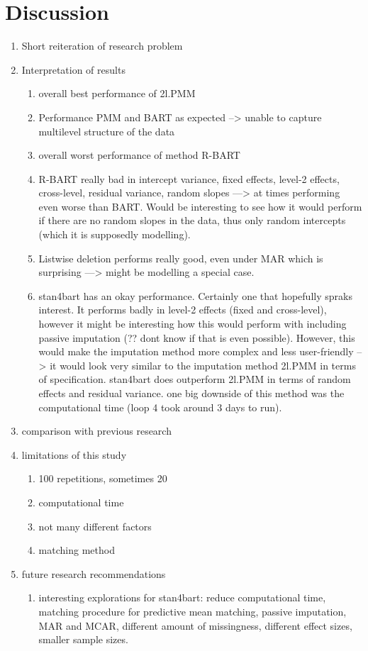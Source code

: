 \documentclass[10pt, a4paper, titlepage]{article}
\begin{document}
\section{Discussion}
\begin{enumerate}
    \item Short reiteration of research problem
    \item Interpretation of results
    \begin{enumerate}
        \item overall best performance of 2l.PMM 
        \item Performance PMM and BART as expected --> unable to capture multilevel structure of the data 
        \item overall worst performance of method R-BART
        \item R-BART really bad in intercept variance, fixed effects, level-2 effects, cross-level, residual variance, random slopes ---> at times performing even worse than BART. Would be interesting to see how it would perform if there are no random slopes in the data, thus only random intercepts (which it is supposedly modelling). 
        \item Listwise deletion performs really good, even under MAR which is surprising ---> might be modelling a special case. 
        \item stan4bart has an okay performance. Certainly one that hopefully spraks interest. It performs badly in level-2 effects (fixed and cross-level), however it might be interesting how this would perform with including passive imputation (?? dont know if that is even possible). However, this would make the imputation method more complex and less user-friendly --> it would look very similar to the imputation method 2l.PMM in terms of specification. stan4bart does outperform 2l.PMM in terms of random effects and residual variance. one big downside of this method was the computational time (loop 4 took around 3 days to run).
    \end{enumerate}
    \item comparison with previous research 
    \item limitations of this study
    \begin{enumerate}
        \item 100 repetitions, sometimes 20
        \item computational time 
        \item not many different factors
        \item matching method 
    \end{enumerate}
    \item future research recommendations
    \begin{enumerate}
        \item interesting explorations for stan4bart: reduce computational time, matching procedure for predictive mean matching, passive imputation, MAR and MCAR, different amount of missingness, different effect sizes, smaller sample sizes.
    \end{enumerate}
\end{enumerate}
\end{document}
